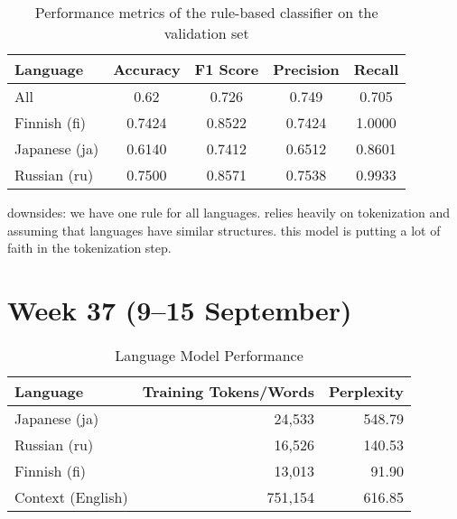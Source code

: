 \documentclass[11pt]{article}
\begin{document}
\begin{enumerate}
    \begin{table}[ht]
        \centering
        \begin{tabular}{|l|c|c|c|c|}
            \hline
            Language & Accuracy & F1 Score & Precision & Recall \\
            \hline
            All & 0.62 & 0.726 & 0.749 & 0.705 \\
            Finnish (fi) & 0.7424 & 0.8522 & 0.7424 & 1.0000 \\
            Japanese (ja) & 0.6140 & 0.7412 & 0.6512 & 0.8601 \\
            Russian (ru) & 0.7500 & 0.8571 & 0.7538 & 0.9933 \\
            \hline
        \end{tabular}
        \caption{Performance metrics of the rule-based classifier on the validation set}
        \label{tab:classifier_performance}
    \end{table}

    downsides:
        we have one rule for all languages. relies heavily on tokenization and assuming that languages have similar structures.
        this model is putting a lot of faith in the tokenization step.

\end{enumerate}

\section{Week 37 (9--15 September)}


\begin{table}[ht]
    \centering
    \begin{tabular}{|l|r|r|}
        \hline
        Language & Training Tokens/Words & Perplexity \\
        \hline
        Japanese (ja) & 24,533 & 548.79 \\
        Russian (ru) & 16,526 & 140.53 \\
        Finnish (fi) & 13,013 & 91.90 \\
        Context (English) & 751,154 & 616.85 \\
        \hline
    \end{tabular}
    \caption{Language Model Performance}
    \label{tab:language_model_performance}
\end{table}
\end{document}
